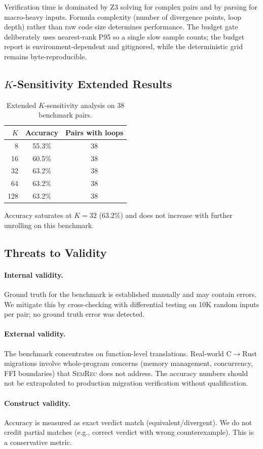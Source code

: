 \documentclass[10pt,a4paper]{article}
\begin{document}
\begin{appendices}
Verification time is dominated by Z3 solving for complex pairs and
by parsing for macro-heavy inputs.  Formula complexity (number of
divergence points, loop depth) rather than raw code size determines
performance.  The budget gate deliberately uses nearest-rank P95 so a single
slow sample counts; the budget report is environment-dependent and gitignored,
while the deterministic grid remains byte-reproducible.

\subsection{$K$-Sensitivity Extended Results}

\begin{table}[h!]
\centering
\small
\caption{Extended $K$-sensitivity analysis on 38 benchmark pairs.}
\label{tab:k-extended}
\begin{tabular}{@{}rcc@{}}
\toprule
$K$ & Accuracy & Pairs with loops \\
\midrule
8   & 55.3\% & 38 \\
16  & 60.5\% & 38 \\
32  & 63.2\% & 38 \\
64  & 63.2\% & 38 \\
128 & 63.2\% & 38 \\
\bottomrule
\end{tabular}
\end{table}

Accuracy saturates at $K{=}32$ (63.2\%) and does not increase
with further unrolling on this benchmark.

\subsection{Threats to Validity}

\paragraph{Internal validity.}
Ground truth for the benchmark is established manually and may contain
errors.  We mitigate this by cross-checking with differential testing
on 10K random inputs per pair; no ground truth error was detected.

\paragraph{External validity.}
The benchmark concentrates on function-level translations.  Real-world
C$\to$Rust migrations involve whole-program concerns (memory
management, concurrency, FFI boundaries) that \textsc{SemRec} does
not address.  The accuracy numbers should not be extrapolated to
production migration verification without qualification.

\paragraph{Construct validity.}
Accuracy is measured as exact verdict match (equivalent/divergent).
We do not credit partial matches (e.g., correct verdict with wrong
counterexample).  This is a conservative metric.


\end{appendices}
\end{document}
